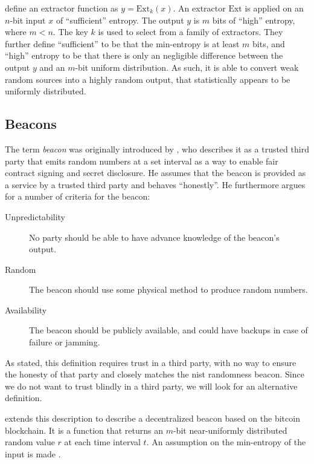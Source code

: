 \citet{bonneau2015bitcoin} define an extractor function as $y = \text{Ext}_k(x)$.
An extractor $\text{Ext}$ is applied on an $n$-bit input $x$ of \enquote{sufficient} entropy.
The output $y$ is $m$ bits of \enquote{high} entropy, where $m < n$. The key $k$ is used to select from a family of extractors.
They further define \enquote{sufficient} to be that the min-entropy is at least $m$ bits, and \enquote{high} entropy to be that there is only an negligible difference between the output $y$ and an $m$-bit uniform distribution.
As such, it is able to convert weak random sources into a highly random output, that statistically appears to be uniformly distributed.

\subsection{Beacons}

The term \emph{beacon} was originally introduced by \citet{rabin1983transaction}, who describes it as a trusted third party that emits random numbers at a set interval as a way to enable fair contract signing and secret disclosure.
He assumes that the beacon is provided as a service by a trusted third party and behaves \enquote{honestly}.
He furthermore argues for a number of criteria for the beacon:

\begin{description}
    \item[Unpredictability] No party should be able to have advance knowledge of the beacon's output.
    \item[Random] The beacon should use some physical method to produce random numbers.
    \item[Availability] The beacon should be publicly available, and could have backups in case of failure or jamming.
\end{description}

As stated, this definition requires trust in a third party, with no way to ensure the honesty of that party and closely matches the \gls{nist} randomness beacon.
Since we do not want to trust blindly in a third party, we will look for an alternative definition.

\citet{bonneau2015bitcoin} extends this description to describe a decentralized beacon based on the bitcoin blockchain.
It is a function that returns an $m$-bit near-uniformly distributed random value $r$ at each time interval $t$. An assumption on the min-entropy of the input is made .


